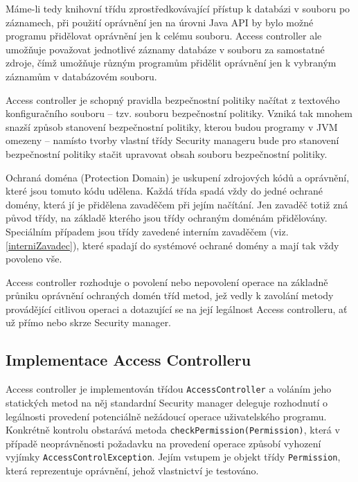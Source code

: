 Máme-li tedy knihovní třídu zprostředkovávající přístup k databázi v souboru po záznamech, při použití oprávnění jen na úrovni Java API by bylo možné programu přidělovat oprávnění jen k celému souboru. Access controller ale umožňuje považovat jednotlivé záznamy databáze v souboru za samostatné zdroje, čímž umožňuje různým programům přidělit oprávnění jen k vybraným záznamům v databázovém souboru.

Access controller je schopný pravidla bezpečnostní politiky načítat z textového konfiguračního souboru -- tzv. souboru bezpečnostní politiky. Vzniká tak mnohem snazší způsob stanovení bezpečnostní politiky, kterou budou programy v JVM omezeny -- namísto tvorby vlastní třídy Security manageru bude pro stanovení bezpečnostní politiky stačit upravovat obsah souboru bezpečnostní politiky. \cite[5]{oaks}

Ochraná doména (Protection Domain) je uskupení zdrojových kódů a oprávnění, které jsou tomuto kódu udělena. Každá třída spadá vždy do jedné ochrané domény, která jí je přidělena zavaděčem při jejím načítání. Jen zavaděč totiž zná původ třídy, na základě kterého jsou třídy ochraným doménám přidělovány. Speciálním případem jsou třídy zavedené interním zavaděčem (viz. \ref{interniZavadec}), které spadají do systémové ochrané domény a mají tak vždy povoleno vše. \cite[5.4]{oaks}

Access controller rozhoduje o povolení nebo nepovolení operace na základně průniku oprávnění ochraných domén tříd metod, jež vedly k zavolání metody provádějící citlivou operaci a dotazující se na její legálnost Access controlleru, ať už přímo nebo skrze Security manager.

\subsection{Implementace Access Controlleru}\label{implementaceAC}

Access controller je implementován třídou {\tt AccessController} a voláním jeho statických metod na něj standardní Security manager deleguje rozhodnutí o legálnosti provedení potenciálně nežádoucí operace uživatelského programu. Konkrétně kontrolu obstarává metoda {\tt checkPermission(Permission)}, která v případě neoprávněnosti požadavku na provedení operace způsobí vyhození vyjímky {\tt AccessControlException}. Jejím vstupem je objekt třídy {\tt Permission}, která reprezentuje oprávnění, jehož vlastnictví je testováno. \cite[5.5]{oaks}\cite[6]{oaks}

